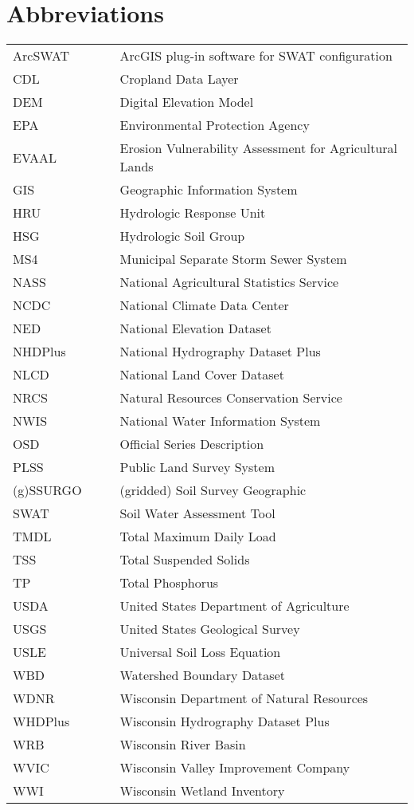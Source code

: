 \section*{Abbreviations}

\begin{tabular}{l c c l}

ArcSWAT &   & & ArcGIS plug-in software for SWAT configuration \\
CDL		&	& &	Cropland Data Layer				\\
DEM		&	& &	Digital Elevation Model			\\
EPA		&	& &	Environmental Protection Agency	\\
EVAAL	&	& & Erosion Vulnerability Assessment for Agricultural Lands \\
GIS     &   & & Geographic Information System \\
HRU 	& 	& &	Hydrologic Response Unit 		\\
HSG		&	& &	Hydrologic Soil Group			\\
MS4		&	& &	Municipal Separate Storm Sewer System \\
NASS	&	& &	National Agricultural Statistics Service \\
NCDC	&	& &	National Climate Data Center \\
NED     &   & & National Elevation Dataset \\
NHDPlus &   & & National Hydrography Dataset Plus \\
NLCD	&	& &	National Land Cover Dataset	\\
NRCS	& 	& &	Natural Resources Conservation Service \\
NWIS	&	& &	National Water Information System \\
OSD		&	& &	Official Series Description \\
PLSS    &   & & Public Land Survey System \\
(g)SSURGO	& & &	(gridded) Soil Survey Geographic \\
SWAT 	& 	& &	Soil Water Assessment Tool 		\\
TMDL	&	& &	Total Maximum Daily Load		\\
TSS		&	& &	Total Suspended Solids		\\
TP		&	& & Total Phosphorus			\\
USDA	&	& &	United States Department of Agriculture\\
USGS 	&	& &	United States Geological Survey \\
USLE	&	& &	Universal Soil Loss Equation	\\
WBD		&	& &	Watershed Boundary Dataset		\\
WDNR	&	& &	Wisconsin Department of Natural Resources \\
WHDPlus	&	& &	Wisconsin Hydrography Dataset Plus \\
WRB		&	& &	Wisconsin River Basin			\\
WVIC	&	& &	Wisconsin Valley Improvement Company \\
WWI		&	& &	Wisconsin Wetland Inventory		\\
\end{tabular}

\clearpage